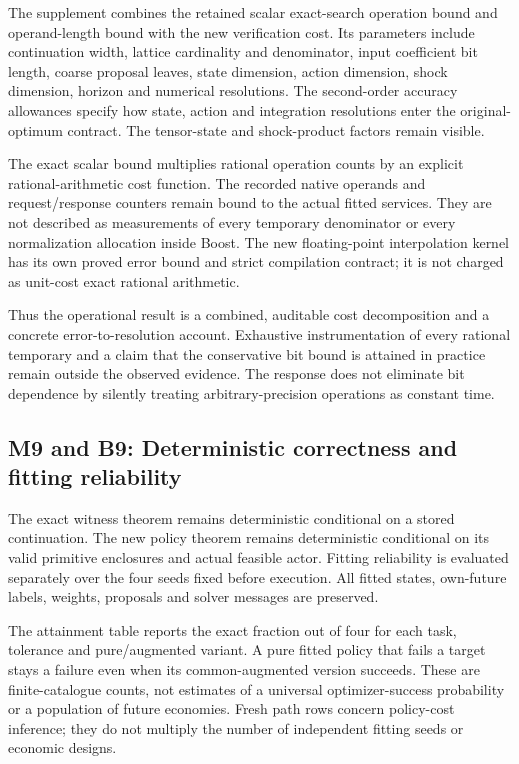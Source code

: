 The supplement combines the retained scalar exact-search operation bound
and operand-length bound with the new verification cost. Its parameters
include continuation width, lattice cardinality and denominator, input
coefficient bit length, coarse proposal leaves, state dimension, action
dimension, shock dimension, horizon and numerical resolutions. The
second-order accuracy allowances specify how state, action and
integration resolutions enter the original-optimum contract. The
tensor-state and shock-product factors remain visible.

The exact scalar bound multiplies rational operation counts by an
explicit rational-arithmetic cost function. The recorded native operands
and request/response counters remain bound to the actual fitted
services. They are not described as measurements of every temporary
denominator or every normalization allocation inside Boost. The new
floating-point interpolation kernel has its own proved error bound and
strict compilation contract; it is not charged as unit-cost exact
rational arithmetic.

Thus the operational result is a combined, auditable cost decomposition
and a concrete error-to-resolution account. Exhaustive instrumentation
of every rational temporary and a claim that the conservative bit bound
is attained in practice remain outside the observed evidence. The
response does not eliminate bit dependence by silently treating
arbitrary-precision operations as constant time.

\hypertarget{m9-and-b9-deterministic-correctness-and-fitting-reliability}{%
\subsection{M9 and B9: Deterministic correctness and fitting
reliability}\label{m9-and-b9-deterministic-correctness-and-fitting-reliability}}

The exact witness theorem remains deterministic conditional on a stored
continuation. The new policy theorem remains deterministic conditional
on its valid primitive enclosures and actual feasible actor. Fitting
reliability is evaluated separately over the four seeds fixed before
execution. All fitted states, own-future labels, weights, proposals and
solver messages are preserved.

The attainment table reports the exact fraction out of four for each
task, tolerance and pure/augmented variant. A pure fitted policy that
fails a target stays a failure even when its common-augmented version
succeeds. These are finite-catalogue counts, not estimates of a
universal optimizer-success probability or a population of future
economies. Fresh path rows concern policy-cost inference; they do not
multiply the number of independent fitting seeds or economic designs.

